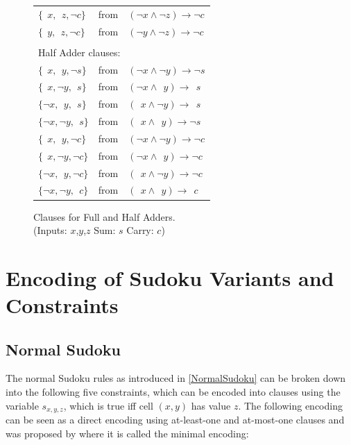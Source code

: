 \begin{figure}
\begin{tabular}{l l l}
     $\{~~x, ~~z, \neg c\}$          & from & $(\neg x      \land \neg z)   \rightarrow \neg c$ \\
     $\{~~y, ~~z, \neg c\}$          & from & $(\neg y      \land \neg z)   \rightarrow \neg c$ \\
     &&\\
     \multicolumn {3}{l}{Half Adder clauses:}\\
     $\{~~x, ~~y, \neg s\}$          & from & $(\neg x      \land \neg y)   \rightarrow \neg s$ \\
     $\{~~x, \neg y, ~~s\}$          & from & $(\neg x      \land ~~y)      \rightarrow ~~s$ \\
     $\{\neg x, ~~y, ~~s\}$          & from & $(~~x         \land \neg y)   \rightarrow ~~s$ \\
     $\{\neg x, \neg y, ~~s\}$       & from & $(~~x         \land ~~y)   \rightarrow \neg s$ \\
     $\{~~x, ~~y, \neg c\}$          & from & $(\neg x      \land \neg y)   \rightarrow \neg c$ \\
     $\{~~x, \neg y, \neg c\}$          & from & $(\neg x      \land ~~y)      \rightarrow \neg c$ \\
     $\{\neg x, ~~y, \neg c\}$          & from & $(~~x         \land \neg y)   \rightarrow \neg c$ \\
     $\{\neg x, \neg y, ~~c\}$       & from & $(~~x         \land ~~y)   \rightarrow ~~c$ \\
    \end{tabular}
    \caption{Clauses for Full and Half Adders.\\
    (Inputs: $x$,$y$,$z$  Sum: $s$  Carry: $c$)}
    \label{AdderNetworkClauses}
\end{figure}

\newpage
\section{Encoding of Sudoku Variants and Constraints}

\subsection{Normal Sudoku}
The normal Sudoku rules as introduced in \ref{NormalSudoku} can be broken down into the following five constraints, which can be encoded into clauses using the variable $s_{x,y,z}$, which is true iff cell $(x,y)$ has value $z$. The following encoding can be seen as a direct encoding using at-least-one and at-most-one clauses and was proposed by \cite{Lynce2006SudokuAsASATProblem} where it is called the minimal encoding:\\


